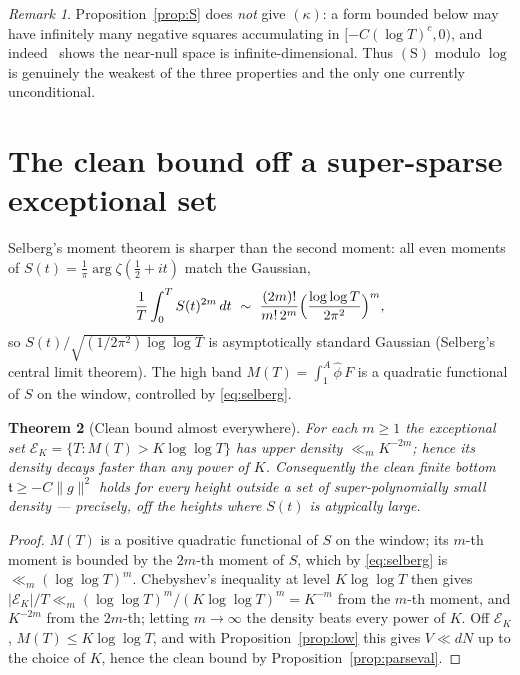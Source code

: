\documentclass[11pt]{amsart}
\newtheorem{theorem}{Theorem}[section]
\theoremstyle{definition}
\theoremstyle{remark}
\newtheorem{remark}[theorem]{Remark}
\newcommand{\ft}{\mathfrak t}
\begin{document}
\begin{remark}
Proposition~\ref{prop:S} does \emph{not} give $(\kappa)$: a form bounded below may
have infinitely many negative squares accumulating in $[-C(\log T)^c,0)$, and
indeed~\cite{RP16} shows the near-null space is infinite-dimensional. Thus
$(\mathrm S)$ modulo $\log$ is genuinely the weakest of the three properties and
the only one currently unconditional.
\end{remark}

\section{The clean bound off a super-sparse exceptional set}
Selberg's moment theorem is sharper than the second moment: all even moments of
$S(t)=\tfrac1\pi\arg\zeta(\tfrac12+it)$ match the Gaussian,
\begin{equation}\label{eq:selberg}
\frac1T\int_0^T S(t)^{2m}\,dt\ \sim\ \frac{(2m)!}{m!\,2^m}\Bigl(\frac{\log\log T}{2\pi^2}\Bigr)^{m},
\end{equation}
so $S(t)/\sqrt{(1/2\pi^2)\log\log T}$ is asymptotically standard Gaussian
(Selberg's central limit theorem). The high band $M(T)=\int_1^A\widehat\phi\,F$ is
a quadratic functional of $S$ on the window, controlled by \eqref{eq:selberg}.

\begin{theorem}[Clean bound almost everywhere]\label{thm:ae}
For each $m\ge1$ the exceptional set $\mathcal E_K=\{T:M(T)>K\log\log T\}$ has
upper density $\ll_m K^{-2m}$; hence its density decays faster than any power of
$K$. Consequently the clean finite bottom $\ft\ge-C\|g\|^2$ holds for every height
outside a set of super-polynomially small density --- precisely, off the
heights where $S(t)$ is atypically large.
\end{theorem}
\begin{proof}
$M(T)$ is a positive quadratic functional of $S$ on the window; its $m$-th moment
is bounded by the $2m$-th moment of $S$, which by \eqref{eq:selberg} is
$\ll_m(\log\log T)^m$. Chebyshev's inequality at level $K\log\log T$ then gives
$|\mathcal E_K|/T\ll_m(\log\log T)^m/(K\log\log T)^m=K^{-m}$ from the $m$-th
moment, and $K^{-2m}$ from the $2m$-th; letting $m\to\infty$ the density beats
every power of $K$. Off $\mathcal E_K$, $M(T)\le K\log\log T$, and with
Proposition~\ref{prop:low} this gives $V\ll dN$ up to the choice of $K$, hence the
clean bound by Proposition~\ref{prop:parseval}.
\end{proof}
\end{document}
